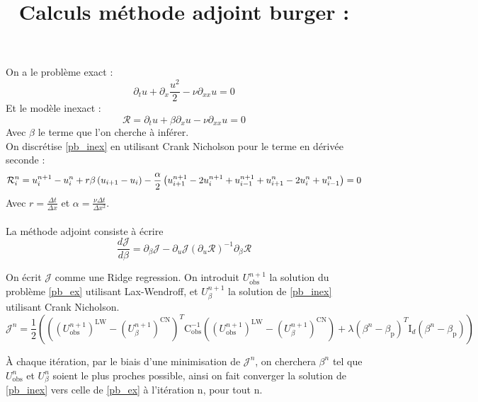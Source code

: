 \documentclass[a4paper,12pt]{article}
\title{\navy \textbf{Calculs méthode adjoint burger : \color{black}}}%
\date{}
\newcommand{\bepar}[1]{
	\left( #1 \right)  
}
\numberwithin{equation}{section} %
\begin{document}
\maketitle 
\setcounter{section}{1}
\noindent On a le problème exact :
\begin{equation} \tag{1 - exact}
\partial_t u + \partial_x \frac{u^2}{2} - \nu \partial_{xx}u = 0 \label{pb_ex}
\end{equation}
Et le modèle inexact :
\begin{equation} \tag{2 - inexact}
\mathcal{R} = \partial_t u + \beta \partial_x u - \nu \partial_{xx}u = 0 \label{pb_inex}
\end{equation}
Avec $\beta$ le terme que l'on cherche à inférer.\\

\noindent  On discrétise \eqref{pb_inex} en utilisant Crank Nicholson pour le terme en dérivée seconde :
\begin{equation} \setcounter{equation}{1}
\mathcal{R}^n_i = u^{n+1}_i - u^n_i + r \beta  \bepar{u_{i+1} - u_i} - \frac{\alpha}{2} \bepar{u^{n+1}_{i+1} - 2u^{n+1}_i + u^{n+1}_{i-1} + u^{n}_{i+1} - 2 u^{n}_{i} + u^{n}_{i-1}}  = 0 \label{inex_discr}
\end{equation}
Avec $\displaystyle r = \frac{\Delta t}{\Delta x}$ et $ \displaystyle\alpha = \frac{\nu\Delta t}{\Delta x ^2}$.\\
 \\
 \noindent La méthode adjoint consiste à écrire 
 \begin{equation}
\frac{d\mathcal{J}}{d\beta} = \partial_\beta \mathcal{J} - \partial_u \mathcal{J} \bepar{\partial_u \mathcal{R}}^{-1}\partial_\beta\mathcal{R} \label{adjoint}
 \end{equation}
 
\noindent On écrit $\mathcal{J}$ comme une Ridge regression. On introduit $U^{n+1}_{\text{obs}}$ la solution du problème \eqref{pb_ex} utilisant Lax-Wendroff, et $U^{n+1}_\beta$ la solution de \eqref{pb_inex} utilisant Crank Nicholson.\\
 \begin{equation}
 \mathcal{J}^n = \frac{1}{2} \bepar{\bepar{\bepar{U^{n+1}_{\text{obs}}}^\text{LW} - \bepar{U^{n+1}_\beta}^\text{CN}}^T \text{C}_\text{obs}^{-1} \bepar{\bepar{U^{n+1}_{\text{obs}}}^\text{LW} - \bepar{U^{n+1}_\beta}^\text{CN}} + \lambda \bepar{\beta^n - \beta_{\text{p}}}^T \text{I}_d \bepar{\beta^n - \beta_\text{p}}}
 \end{equation}
 
 
\noindent À chaque itération, par le biais d'une minimisation de $\mathcal{J}^n$, on cherchera $\beta^n$ tel que $U^n_{\text{obs}}$ et $U^n_\beta$ soient le plus proches possible, ainsi on fait converger la solution de \eqref{pb_inex} vers celle de \eqref{pb_ex} à l'itération n, pour tout n.\\
   
\end{document}
